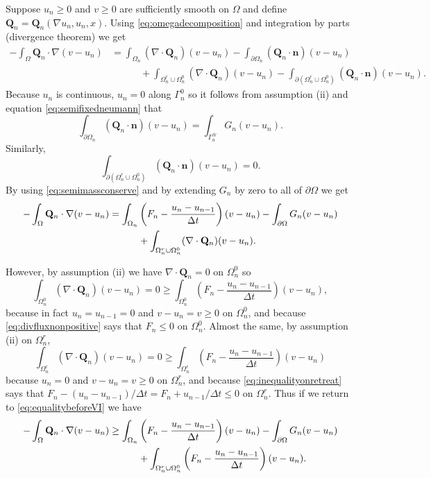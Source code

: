 \documentclass[final,leqno,onefignum,onetabnum]{siamltex1213bueler}
\newcommand\bn{\mathbf{n}}
\newcommand\bQ{\mathbf{Q}}
\newcommand{\Div}{\nabla\cdot}
\renewcommand{\grad}{\nabla}
\begin{document}
Suppose $u_n\ge 0$ and $v\ge 0$ are sufficiently smooth on $\Omega$ and define $\bQ_n=\bQ_n(\grad u_n,u_n,x)$.  Using \eqref{eq:omegadecomposition} and integration by parts (divergence theorem) we get
\begin{align*}
-\int_{\Omega} \bQ_n \cdot \grad(v-u_n) &= \int_{\Omega_n} (\Div \bQ_n) (v-u_n) - \int_{\partial \Omega_n} (\bQ_n \cdot \bn) (v-u_n) \\
  &\qquad\quad + \int_{\Omega_n^r \cup \Omega_n^0} (\Div \bQ_n) (v-u_n) - \int_{\partial(\Omega_n^r \cup \Omega_n^0)} (\bQ_n \cdot \bn) (v-u_n).
\end{align*}
Because $u_n$ is continuous, $u_n=0$ along $\Gamma_n^0$ so it follows from assumption (ii) and equation \eqref{eq:semifixedneumann} that
       $$\int_{\partial \Omega_n} (\bQ_n \cdot \bn) (v-u_n) = \int_{\Gamma_n^N} G_n (v-u_n).$$
Similarly,
       $$\int_{\partial(\Omega_n^r \cup \Omega_n^0)} (\bQ_n \cdot \bn) (v-u_n) = 0.$$
By using \eqref{eq:semimassconserve} and by extending $G_n$ by zero to all of $\partial \Omega$ we get
\begin{align}
-\int_{\Omega} \bQ_n \cdot \grad(v-u_n) &= \int_{\Omega_n} \left(F_n - \frac{u_n - u_{n-1}}{\Delta t}\right) (v-u_n) - \int_{\partial \Omega} G_n (v-u_n) \label{eq:equalitybeforeVI} \\
  &\qquad\quad + \int_{\Omega_n^r \cup \Omega_n^0} (\Div \bQ_n) (v-u_n). \notag
\end{align}

However, by assumption (ii) we have $\Div \bQ_n=0$ on $\Omega_n^0$ so
    $$\int_{\Omega_n^0} (\Div \bQ_n) (v-u_n) = 0 \ge \int_{\Omega_n^0} \left(F_n - \frac{u_n - u_{n-1}}{\Delta t}\right) (v-u_n),$$
because in fact $u_n=u_{n-1}=0$ and $v-u_n = v \ge 0$ on $\Omega_n^0$, and because \eqref{eq:divfluxnonpositive} says that $F_n \le 0$ on $\Omega_n^0$.  Almost the same, by assumption (ii) on $\Omega_n^r$,
    $$\int_{\Omega_n^r} (\Div \bQ_n) (v-u_n) = 0 \ge \int_{\Omega_n^r} \left(F_n - \frac{u_n - u_{n-1}}{\Delta t}\right) (v-u_n)$$
because $u_n=0$ and $v-u_n = v \ge 0$ on $\Omega_n^r$, and because \eqref{eq:inequalityonretreat} says that $F_n - (u_n - u_{n-1})/\Delta t = F_n + u_{n-1}/\Delta t \le 0$ on $\Omega_n^r$.  Thus if we return to \eqref{eq:equalitybeforeVI} we have
\begin{align}
-\int_{\Omega} \bQ_n \cdot \grad(v-u_n) &\ge \int_{\Omega_n} \left(F_n - \frac{u_n - u_{n-1}}{\Delta t}\right) (v-u_n) - \int_{\partial \Omega} G_n (v-u_n) \label{eq:essentiallyVI} \\
  &\qquad\quad + \int_{\Omega_n^r \cup \Omega_n^0} \left(F_n - \frac{u_n - u_{n-1}}{\Delta t}\right) (v-u_n). \notag
\end{align}
\end{document}
